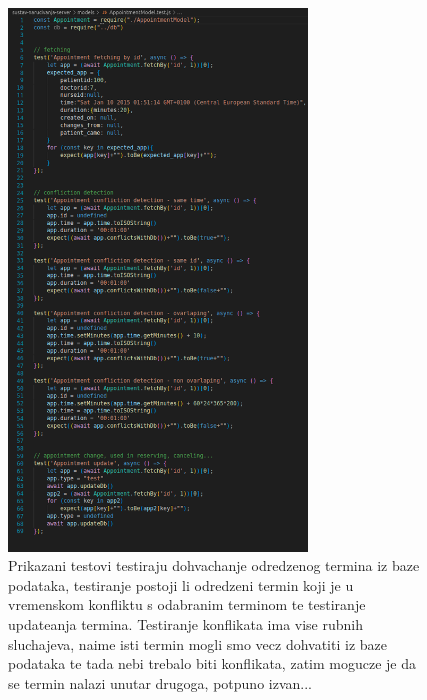             \begin{figure}[H]
                    \includegraphics[width=300]{slike/appointment_tests_code.png} %
                    \caption{Prikazani testovi testiraju dohvachanje odredzenog termina iz baze podataka, testiranje postoji li odredzeni termin koji je u vremenskom konfliktu s odabranim terminom te testiranje updateanja termina. Testiranje konflikata ima vise rubnih sluchajeva, naime isti termin mogli smo vecz dohvatiti iz baze podataka te tada nebi trebalo biti konflikata, zatim mogucze je da se termin nalazi unutar drugoga, potpuno izvan...}
                    \label{fig:struktura} %
                \end{figure}


